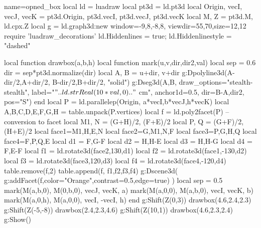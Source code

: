 \documentclass[]{standalone}%
\begin{document}
\begin{luadraw}{name=opned_box}
local ld = luadraw
local pt3d = ld.pt3d
local Origin, vecI, vecJ, vecK = pt3d.Origin, pt3d.vecI, pt3d.vecJ, pt3d.vecK
local M, Z = pt3d.M, ld.cpx.Z
local g = ld.graph3d:new{ window={-9,8,-8,8}, viewdir={55,70},size={12,12}}
require 'luadraw_decorations'
ld.Hiddenlines = true; ld.Hiddenlinestyle = "dashed"

local function drawbox(a,b,h)
    local function mark(u,v,dir,dir2,val)
        local sep = 0.6
        dir = sep*pt3d.normalize(dir)
        local A, B = u+dir, v+dir
        g:Dpolyline3d({{A-dir/2,A+dir/2}, {B-dir/2,B+dir/2}}, "solid")
        g:Dseg3d({A,B}, 
            {draw_options="stealth-stealth", label="$"..ld.strReal(10*val,0).."$ cm", anchor1d=0.5, 
             dir={B-A,dir2}, pos="S"})
    end
    local P = ld.parallelep(Origin, a*vecI,b*vecJ,h*vecK)
    local A,B,C,D,E,F,G,H = table.unpack(P.vertices)
    local f = ld.poly2facet(P) -- conversion to facet
    local M1, N = (G+H)/2, (F+E)/2
    local P, Q = (G+F)/2, (H+E)/2
    local face1={M1,H,E,N}
    local face2={G,M1,N,F}
    local face3={P,G,H,Q}
    local face4={F,P,Q,E}
    local d1 = {F,G-F}
    local d2 = {H,H-E}
    local d3 = {H,H-G}
    local d4 = {F,E-F}
    local f1 = ld.rotate3d(face2,130,d1) 
    local f2 = ld.rotate3d(face1,-130,d2) 
    local f3 = ld.rotate3d(face3,120,d3)
    local f4 = ld.rotate3d(face4,-120,d4)
    table.remove(f,2)
    table.append(f, {f1,f2,f3,f4})
    g:Dscene3d( g:addFacet(f,{color="Orange",contrast=0.5,edge=true}) )
    local sep = 0.5
    mark(M(a,b,0), M(0,b,0), vecJ, vecK, a)
    mark(M(a,0,0), M(a,b,0), vecI, vecK, b)
    mark(M(a,0,h), M(a,0,0), vecI, -vecI, h)
end
g:Shift(Z(0,3))
drawbox(4.6,2.4,2.3)
g:Shift(Z(-5,-8))
drawbox(2.4,2.3,4.6)
g:Shift(Z(10,1))
drawbox(4.6,2.3,2.4)
g:Show()
\end{luadraw}
\end{document}
